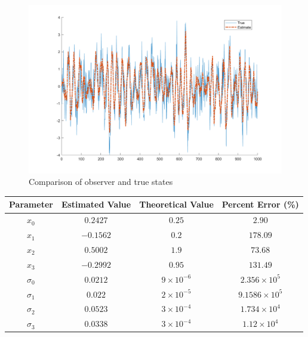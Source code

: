 \documentclass[12pt,letterpaper, onecolumn]{exam}
\begin{document}
\begin{questions}
\begin{parts}
{            \begin{figure}[!h]
                \centering
                \includegraphics[width=0.75\linewidth]{output_4d.png}
                \caption{Comparison of observer and true states}
                \label{fig:9}
            \end{figure}
            \clearpage
            \begin{table}[h!]
                \centering
                \begin{tabular}{|c|c|c|c|}
                    \hline
                    Parameter  & Estimated Value & Theoretical Value & Percent Error (\%) \\
                    \hline
                    $x_0$      & $0.2427$        & $0.25$            & $2.90$             \\
                    $x_1$      & $-0.1562$       & $0.2$             & $178.09$           \\
                    $x_2$      & $0.5002$        & $1.9$             & $73.68$            \\
                    $x_3$      & $-0.2992$       & $0.95$            & $131.49$           \\
                    \hline
                    $\sigma_0$ & $0.0212$        & $9\times10^{-6}$  & $2.356\times10^5$  \\
                    $\sigma_1$ & $0.022$         & $2\times10^{-5}$  & $9.1586\times10^5$ \\
                    $\sigma_2$ & $0.0523$        & $3\times10^{-4}$  & $1.734\times10^4$  \\
                    $\sigma_3$ & $0.0338$        & $3\times10^{-4}$  & $1.12\times10^4$   \\
                    \hline
                \end{tabular}
            \end{table}
        }

\end{parts}
\end{questions}
\end{document}
